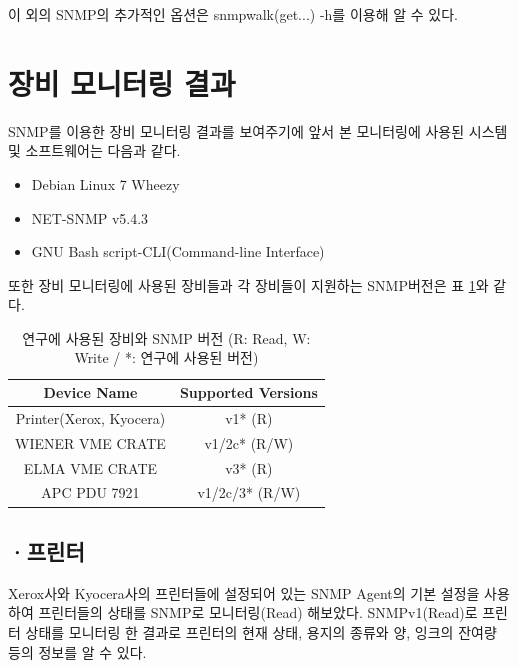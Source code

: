 \documentclass[11pt
  , a4paper
  , article
  , oneside
]{memoir}
\begin{document}
이 외의 SNMP의 추가적인 옵션은 snmpwalk(get...) -h를 이용해 알 수 있다.


\clearpage
\section{장비 모니터링 결과}
SNMP를 이용한 장비 모니터링 결과를 보여주기에 앞서 본 모니터링에 사용된 시스템 및 소프트웨어는 다음과 같다.

\begin{itemize}
\item Debian Linux 7 Wheezy
\item NET-SNMP v5.4.3
\item GNU Bash script-CLI(Command-line Interface) 
\end{itemize}

또한 장비 모니터링에 사용된 장비들과 각 장비들이 지원하는 SNMP버전은 표 \ref{table:used_version}와 같다.

\begin{table}[h]
\begin{center}
\begin{tabular}{c|c}\hline
Device Name & Supported Versions \\ \hline
Printer(Xerox, Kyocera) & v1* (R) \\ \hline
WIENER VME CRATE & v1/2c* (R/W) \\ \hline
ELMA VME CRATE & v3* (R) \\ \hline
APC PDU 7921 & v1/2c/3* (R/W) \\ \hline
\end{tabular}
\caption{연구에 사용된 장비와 SNMP 버전 (R: Read, W: Write / *: 연구에 사용된 버전)}
  \label{table:used_version}  
\end{center}
\end{table} 

\clearpage
\subsection{·프린터}

Xerox사와 Kyocera사의 프린터들에 설정되어 있는 SNMP Agent의 기본 설정을 사용하여 프린터들의 상태를 SNMP로 모니터링(Read) 해보았다. SNMPv1(Read)로 프린터 상태를 모니터링 한 결과로 프린터의 현재 상태, 용지의 종류와 양, 잉크의 잔여량 등의 정보를 알 수 있다.
\end{document}
